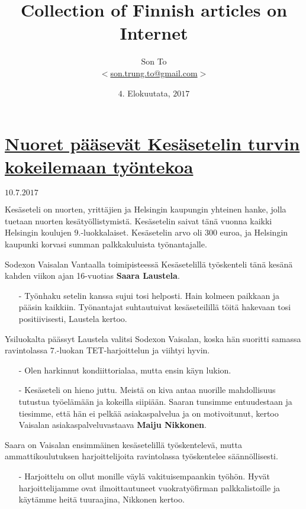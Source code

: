 \documentclass[a4paper,11pt]{article}
\newcommand{\note}[1]{\textbf{#1}}
\begin{document}
  \title{Collection of Finnish articles on Internet}
  \author{Son To\\
  $<$\href{mailto:son.trung.to@gmail.com}%
  {son.trung.to@gmail.com}$>$}
  \date{$4.$ Elokuutata, $2017$}

  \maketitle
  \tableofcontents

  \section{\href{http://www.sodexo.fi/yritys/uutiset/2017-06-20-nuoret-paasevat-kesasetelin-turvin-kokeilemaan-tyontekoa}%
  {Nuoret pääsevät Kesäsetelin turvin kokeilemaan työntekoa}}
  $10.7.2017$
  \par
  Kesäseteli on nuorten, yrittäjien ja Helsingin kaupungin
  yhteinen hanke, jolla tuetaan nuorten kesätyöllistymistä.
  Kesäsetelin saivat tänä vuonna kaikki Helsingin koulujen
  $9.$-luokkalaiset. Kesäsetelin arvo oli $300$ euroa, ja
  Helsingin kaupunki korvasi summan palkkakuluista
  työnantajalle.
  \par
  Sodexon Vaisalan Vantaalla toimipisteessä Kesäsetelillä
  työskenteli tänä kesänä kahden viikon ajan 16-vuotias
  \note{Saara Laustela}.
  \begin{itemize}
    \item[-] Työnhaku setelin kanssa sujui tosi helposti. Hain
    kolmeen paikkaan ja pääsin kaikkiin. Työnantajat suhtautuivat
    kesäseteilillä töitä hakevaan tosi positiivisesti, Laustela
    kertoo.
  \end{itemize}
  Ysiluokalta päässyt Laustela valitsi Sodexon Vaisalan, koska
  hän suoritti samassa ravintolassa $7.$-luokan TET-harjoittelun
  ja viihtyi hyvin.
  \begin{itemize}
    \item[-] Olen harkinnut kondiittorialaa, mutta ensin käyn
    lukion.
    \item[-] Kesäseteli on hieno juttu. Meistä on kiva antaa
    nuorille mahdollisuus tutustua työelämään ja kokeilla
    siipiään. Saaran tunsimme entuudestaan ja tiesimme, että
    hän ei pelkää asiakaspalvelua ja on motivoitunut, kertoo
    Vaisalan asiakaspalveluvastaava \note{Maiju Nikkonen}.
  \end{itemize}
  Saara on Vaisalan ensimmäinen kesäsetelillä työskentelevä,
  mutta ammattikoulutuksen harjoittelijoita ravintolassa
  työskentelee säännöllisesti.
  \begin{itemize}
    \item[-] Harjoittelu on ollut monille väylä
    vakituisempaankin työhön. Hyvät harjoittelijamme ovat
    ilmoittautuneet vuokratyöfirman palkkalistoille ja
    käytämme heitä tuuraajina, Nikkonen kertoo.
  \end{itemize}
\end{document}
